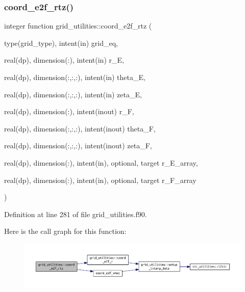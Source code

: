 \subsubsection{\texorpdfstring{coord\+\_\+e2f\+\_\+rtz()}{coord\_e2f\_rtz()}}
{\footnotesize\ttfamily integer function grid\+\_\+utilities\+::coord\+\_\+e2f\+\_\+rtz (\begin{DoxyParamCaption}\item[{type(grid\+\_\+type), intent(in)}]{grid\+\_\+eq,  }\item[{real(dp), dimension(\+:), intent(in)}]{r\+\_\+E,  }\item[{real(dp), dimension(\+:,\+:,\+:), intent(in)}]{theta\+\_\+E,  }\item[{real(dp), dimension(\+:,\+:,\+:), intent(in)}]{zeta\+\_\+E,  }\item[{real(dp), dimension(\+:), intent(inout)}]{r\+\_\+F,  }\item[{real(dp), dimension(\+:,\+:,\+:), intent(inout)}]{theta\+\_\+F,  }\item[{real(dp), dimension(\+:,\+:,\+:), intent(inout)}]{zeta\+\_\+F,  }\item[{real(dp), dimension(\+:), intent(in), optional, target}]{r\+\_\+\+E\+\_\+array,  }\item[{real(dp), dimension(\+:), intent(in), optional, target}]{r\+\_\+\+F\+\_\+array }\end{DoxyParamCaption})}



Definition at line 281 of file grid\+\_\+utilities.\+f90.

Here is the call graph for this function\+:
\nopagebreak
\begin{figure}[H]
\begin{center}
\leavevmode
\includegraphics[width=350pt]{namespacegrid__utilities_a2a3c0509679b438d9d5aa5bedfb7a7b8_cgraph}
\end{center}
\end{figure}
\mbox{\label{namespacegrid__utilities_a04f971c38083f873a04eb6568bed466b}} 
